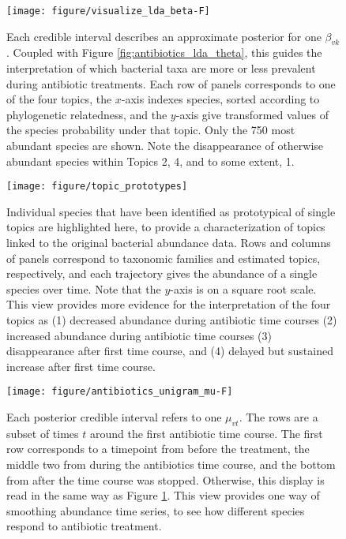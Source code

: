 \documentclass[oupdraft]{bio}
\begin{document}
\begin{figure}[!p]
  \centering\texttt{[image: figure/visualize\_lda\_beta-F]}
  \caption{Each credible interval describes an approximate posterior for one
    $\beta_{vk}$. Coupled with Figure \ref{fig:antibiotics_lda_theta}, this
    guides the interpretation of which bacterial taxa are more or less prevalent
    during antibiotic treatments. Each row of panels corresponds to one of the
    four topics, the $x$-axis indexes species, sorted according to phylogenetic
    relatedness, and the $y$-axis give transformed values of the species probability
    under that topic. Only the 750 most abundant species are shown. Note the
    disappearance of otherwise abundant species within Topics 2, 4, and to some
    extent, 1.} \label{fig:antibiotics_lda_beta}
\end{figure}

\begin{figure}[!p]
  \centering\texttt{[image: figure/topic\_prototypes]}
  \caption{Individual species that have been identified as prototypical of
    single topics are highlighted here, to provide a characterization of topics
    linked to the original bacterial abundance data. Rows and columns of panels
    correspond to taxonomic families and estimated topics,
    respectively, and each trajectory gives the abundance of a single species
    over time. Note that the $y$-axis is on a square root scale. This view
    provides more evidence for the interpretation of the four topics as (1)
    decreased abundance during antibiotic time courses (2) increased abundance during
    antibiotic time courses (3) disappearance after first time course, and (4)
    delayed but sustained increase after first time
    course. \label{fig:topic_prototypes}}
\end{figure}

\begin{figure}[!p]
  \centering
  \texttt{[image: figure/antibiotics\_unigram\_mu-F]}
  \caption{Each posterior credible interval refers to one $\mu_{vt}$. The rows
    are a subset of times $t$ around the first antibiotic time course. The first
    row corresponds to a timepoint from before the treatment, the middle two
    from during the antibiotics time course, and the bottom from after the time
    course was stopped. Otherwise, this display is read in the same way as
    Figure \ref{fig:antibiotics_lda_beta}. This view provides one way of
    smoothing abundance time series, to see how different species respond to
    antibiotic treatment. \label{fig:antibiotics_unigram_theta} }
\end{figure}
\end{document}
